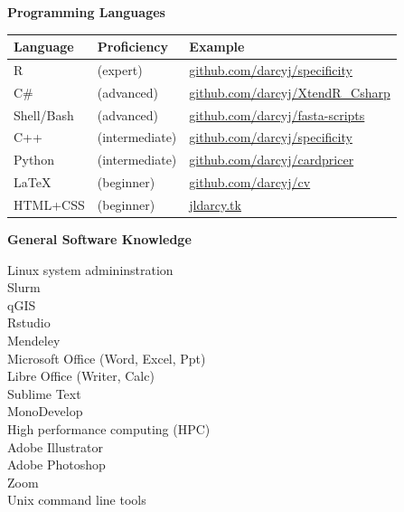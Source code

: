 \documentclass{article}
\begin{document}
{\large  \textbf{Programming Languages}}
\\\begin{tabular}{l l l}
  Language & Proficiency & Example\\
  \hline
  R & (expert) & \href{https://github.com/darcyj/specificity}{github.com/darcyj/specificity}\\
  C\# & (advanced) & \href{https://github.com/darcyj/XtendR_Csharp}{github.com/darcyj/XtendR\_Csharp}\\
  Shell/Bash & (advanced) & \href{https://github.com/darcyj/fasta-scripts}{github.com/darcyj/fasta-scripts}\\
  C++ & (intermediate) & \href{https://github.com/darcyj/specificity}{github.com/darcyj/specificity}\\ 
  Python & (intermediate) & \href{https://github.com/darcyj/cardpricer}{github.com/darcyj/cardpricer}\\
  \LaTeX & (beginner) & \href{https://github.com/darcyj/cv}{github.com/darcyj/cv}\\
  HTML+CSS & (beginner) & \href{jldarcy.tk}{jldarcy.tk}\\
\end{tabular}

\vspace{3mm}
{\large  \textbf{General Software Knowledge}}
  \begin{adjustwidth}{2mm}{}\begin{multicols}{3}
    Linux system admininstration\\
    Slurm\\
    qGIS\\
    Rstudio\\
    Mendeley\\
    Microsoft Office (Word, Excel, Ppt)\\
    Libre Office (Writer, Calc)\\
    Sublime Text\\
    MonoDevelop\\
    High performance computing (HPC)\\
    Adobe Illustrator\\
    Adobe Photoshop\\
    Zoom\\
    Unix command line tools
  \end{multicols}\end{adjustwidth}
\end{document}
